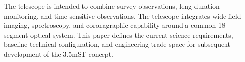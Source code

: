 {The telescope is intended to combine survey observations, long-duration monitoring, and time-sensitive observations. The telescope integrates wide-field imaging, spectroscopy, and 
coronagraphic capability around a common 18-segment optical system.
This paper defines the current science requirements, baseline technical
configuration, and engineering trade space for subsequent development
of the 3.5mST concept.
}

\newcommand{\wpkeywords}{\textbf{Keywords:} segmented mirror, robotic space telescope, cosmology, galaxy evolution, exoplanet, time-domain astronomy, multi-messenger astronomy}
